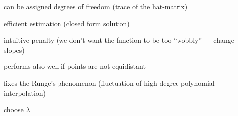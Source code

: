 \begin{my_pros_cons_table}{
    \item can be assigned degrees of freedom (trace of the hat-matrix)
    \item efficient estimation (closed form solution)
    \item intuitive penalty (we don't want the function to be too ``wobbly'' --- change slopes)
    \item performs also well if points are not equidistant
    \item fixes the Runge's phenomenon (fluctuation of high degree polynomial interpolation)
  }{
    \item choose $\lambda$
  }
\end{my_pros_cons_table}




